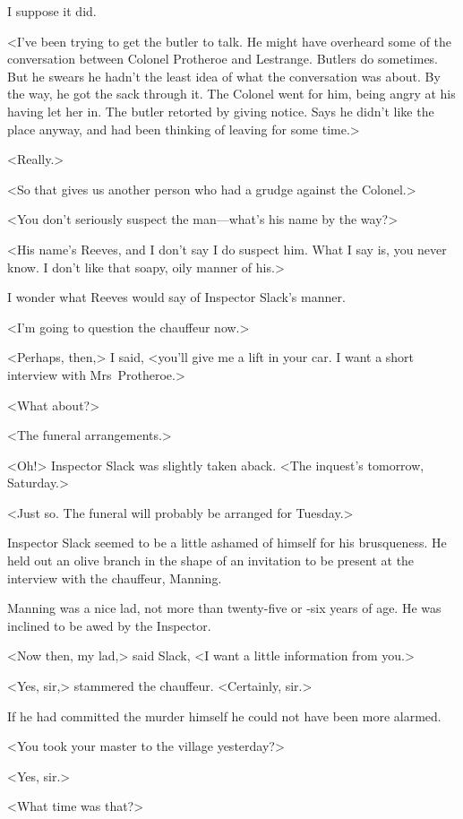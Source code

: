 I suppose it did.

<I've been trying to get the butler to talk. He might have overheard some of the conversation between Colonel Protheroe and Lestrange. Butlers do sometimes. But he swears he hadn't the least idea of what the conversation was about. By the way, he got the sack through it. The Colonel went for him, being angry at his having let her in. The butler retorted by giving notice. Says he didn't like the place anyway, and had been thinking of leaving for some time.>

<Really.>

<So that gives us another person who had a grudge against the Colonel.>

<You don't seriously suspect the man—what's his name by the way?>

<His name's Reeves, and I don't say I do suspect him. What I say is, you never know. I don't like that soapy, oily manner of his.>

I wonder what Reeves would say of Inspector Slack's manner.

<I'm going to question the chauffeur now.>

<Perhaps, then,> I said, <you'll give me a lift in your car. I want a short interview with Mrs~Protheroe.>

<What about?>

<The funeral arrangements.>

<Oh!> Inspector Slack was slightly taken aback. <The inquest's tomorrow, Saturday.>

<Just so. The funeral will probably be arranged for Tuesday.>

Inspector Slack seemed to be a little ashamed of himself for his brusqueness. He held out an olive branch in the shape of an invitation to be present at the interview with the chauffeur, Manning.

Manning was a nice lad, not more than twenty-five or -six years of age. He was inclined to be awed by the Inspector.

<Now then, my lad,> said Slack, <I want a little information from you.>

<Yes, sir,> stammered the chauffeur. <Certainly, sir.>

If he had committed the murder himself he could not have been more alarmed.

<You took your master to the village yesterday?>

<Yes, sir.>

<What time was that?>

